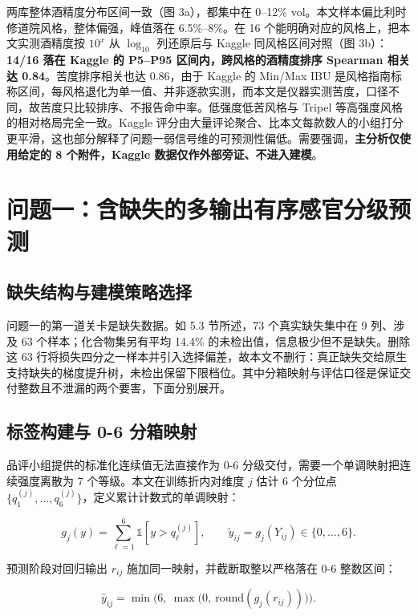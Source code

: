 \documentclass[zihao=-4,a4paper,UTF8,fontset=none]{ctexart}
\begin{document}
两库整体酒精度分布区间一致（图 3a），都集中在 0–12\% vol。本文样本偏比利时修道院风格，整体偏强，峰值落在 6.5\%–8\%。在 16 个能明确对应的风格上，把本文实测酒精度按 $10^{x}$ 从 $\log_{10}$ 列还原后与 Kaggle 同风格区间对照（图 3b）：\textbf{14/16 落在 Kaggle 的 P5–P95 区间内，跨风格的酒精度排序 Spearman 相关达 0.84}。苦度排序相关也达 0.86，由于 Kaggle 的 Min/Max IBU 是风格指南标称区间，每风格退化为单一值、并非逐款实测，而本文是仪器实测苦度，口径不同，故苦度只比较排序、不报告命中率。低强度低苦风格与 Tripel 等高强度风格的相对格局完全一致。Kaggle 评分由大量评论聚合、比本文每款数人的小组打分更平滑，这也部分解释了问题一弱信号维的可预测性偏低。需要强调，\textbf{主分析仅使用给定的 8 个附件，Kaggle 数据仅作外部旁证、不进入建模}。

\section{问题一：含缺失的多输出有序感官分级预测}

\subsection{缺失结构与建模策略选择}

问题一的第一道关卡是缺失数据。如 5.3 节所述，73 个真实缺失集中在 9 列、涉及 63 个样本；化合物集另有平均 14.4\% 的未检出值，信息极少但不是缺失。删除这 63 行将损失四分之一样本并引入选择偏差，故本文不删行：真正缺失交给原生支持缺失的梯度提升树，未检出保留下限档位\cite{b5,b6,b7}。其中分箱映射与评估口径是保证交付整数且不泄漏的两个要害，下面分别展开。

\subsection{标签构建与 0-6 分箱映射}

品评小组提供的标准化连续值无法直接作为 0-6 分级交付，需要一个单调映射把连续强度离散为 7 个等级。本文在训练折内对维度 $j$ 估计 6 个分位点 $\{q^{(j)}_1,\dots,q^{(j)}_6\}$，定义累计计数式的单调映射：

\begin{equation}
g_j(y)=\sum_{\ell=1}^{6}\mathbb{1}\!\left[y> q^{(j)}_\ell\right],\qquad \tilde y_{ij}=g_j(Y_{ij})\in\{0,\dots,6\}.
\end{equation}

预测阶段对回归输出 $r_{ij}$ 施加同一映射，并截断取整以严格落在 0-6 整数区间：

\begin{equation}
\hat y_{ij}=\min\!\Big(6,\ \max\!\big(0,\ \mathrm{round}(g_j(r_{ij}))\big)\Big).
\end{equation}
\end{document}
